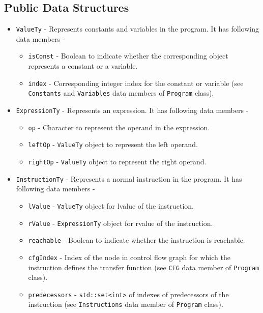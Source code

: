 \subsection{Public Data Structures}
\label{subsec:PublicDataStructuresProgramH}
\begin{itemize} \tightlist
    \item \texttt{ValueTy} - Represents constants and variables in the program. It has following data members -
        \begin{itemize} \tightlist
            \item \texttt{isConst} - Boolean to indicate whether the 
            corresponding object represents a constant or a variable.
            \item \texttt{index} - Corresponding integer index for the constant 
            or variable (see \texttt{Constants} and \texttt{Variables} data 
            members of \texttt{Program} class).
        \end{itemize}
    
    \item \texttt{ExpressionTy} - Represents an expression. It has following data members -
        \begin{itemize} \tightlist
            \item \texttt{op} - Character to represent the operand in the expression.
            \item \texttt{leftOp} - \texttt{ValueTy} object to represent the left operand.
            \item \texttt{rightOp} - \texttt{ValueTy} object to represent the right operand.
        \end{itemize}

    \item \texttt{InstructionTy} - Represents a normal instruction in the program. It has following data members - 
        \begin{itemize} \tightlist
            \item \texttt{lValue} - \texttt{ValueTy} object for lvalue of the instruction.
            \item \texttt{rValue} - \texttt{ExpressionTy} object for rvalue of the instruction.
            \item \texttt{reachable} - Boolean to indicate whether the instruction is reachable.
            \item \texttt{cfgIndex} - Index of the node in control flow graph for which the instruction defines the transfer function (see \texttt{CFG} data member of \texttt{Program} class).
            \item \texttt{predecessors} - \texttt{std::set<int>} of indexes of
            predecessors of the instruction (see \texttt{Instructions} data member of \texttt{Program} class).
        \end{itemize}
    

\end{itemize}
